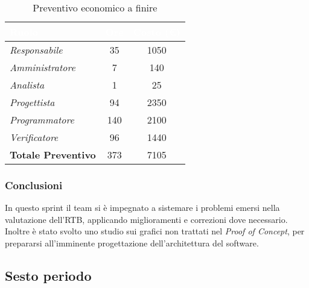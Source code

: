 \begin{table}[H]
    \renewcommand\arraystretch{1.5}
    \centering
    \begin{tabular}{|l|c|c|}
    \hline
    \rowcolor[HTML]{036400}
    \textcolor{white}{\textbf{Ruolo}} & \multicolumn{1}{l|}{\textcolor{white}{\textbf{Ore}}} & \multicolumn{1}{l|}{\textcolor{white}{\textbf{Costo (€)}}} \\ \hline
    \rowcolor[HTML]{EFEFEF}\textit{Responsabile}      & 35              & 1050                 \\ \hline
    \rowcolor[HTML]{C0C0C0}\textit{Amministratore}    & 7               & 140                 \\ \hline
    \rowcolor[HTML]{EFEFEF}\textit{Analista}          & 1               & 25                 \\ \hline
    \rowcolor[HTML]{C0C0C0}\textit{Progettista}       & 94              & 2350                 \\ \hline
    \rowcolor[HTML]{EFEFEF}\textit{Programmatore}     & 140             & 2100                 \\ \hline
    \rowcolor[HTML]{C0C0C0}\textit{Verificatore}      & 96              & 1440                 \\ \hline
    \rowcolor[HTML]{EFEFEF}\textbf{Totale Preventivo} & 373             & 7105            \\ \hline
    \end{tabular}
    \caption{Preventivo economico a finire}
\end{table}

\subsubsection{Conclusioni}
In questo sprint il team si è impegnato a sistemare i problemi emersi nella valutazione dell'RTB, applicando miglioramenti e correzioni dove necessario. Inoltre è stato svolto uno studio sui grafici non trattati nel \textit{Proof of Concept}, per prepararsi all'imminente progettazione dell'architettura del software.

\subsection{Sesto periodo}
